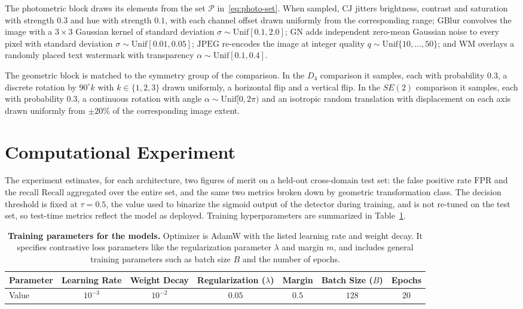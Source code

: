 \documentclass{article}
\begin{document}
The photometric block draws its elements from the set $\mathcal{P}$ in~\eqref{eq:photo-set}. When sampled, $\mathrm{CJ}$ jitters brightness, contrast and saturation with strength $0.3$ and hue with strength $0.1$, with each channel offset drawn uniformly from the corresponding range; $\mathrm{GBlur}$ convolves the image with a $3\times 3$ Gaussian kernel of standard deviation $\sigma\sim\mathrm{Unif}[0.1, 2.0]$; $\mathrm{GN}$ adds independent zero-mean Gaussian noise to every pixel with standard deviation $\sigma\sim\mathrm{Unif}[0.01, 0.05]$; $\mathrm{JPEG}$ re-encodes the image at integer quality $q\sim\mathrm{Unif}\{10, \ldots, 50\}$; and $\mathrm{WM}$ overlays a randomly placed text watermark with transparency $\alpha\sim\mathrm{Unif}[0.1, 0.4]$.

The geometric block is matched to the symmetry group of the comparison. In the $D_4$ comparison it samples, each with probability $0.3$, a discrete rotation by $90^\circ k$ with $k\in\{1, 2, 3\}$ drawn uniformly, a horizontal flip and a vertical flip. In the $SE(2)$ comparison it samples, each with probability $0.3$, a continuous rotation with angle $\alpha\sim\mathrm{Unif}[0, 2\pi)$ and an isotropic random translation with displacement on each axis drawn uniformly from $\pm 20\%$ of the corresponding image extent.

\section{Computational Experiment}\label{sec:exp}

The experiment estimates, for each architecture, two figures of merit on a held-out cross-domain test set: the false positive rate $\mathrm{FPR}$ and the recall $\mathrm{Recall}$ aggregated over the entire set, and the same two metrics broken down by geometric transformation class. The decision threshold is fixed at $\tau = 0.5$, the value used to binarize the sigmoid output of the detector during training, and is not re-tuned on the test set, so test-time metrics reflect the model as deployed. Training hyperparameters are summarized in Table~\ref{tab:hparams}.

\begin{table}[h]
\centering
\small
\caption{\textbf{Training parameters for the models.} Optimizer is AdamW with the listed learning rate and weight decay. It specifies contrastive loss parameters like the regularization parameter $\lambda$ and margin $m$, and includes general training parameters such as batch size $B$ and the number of epochs.}
\label{tab:hparams}
\begin{tabular}{@{}lcccccc@{}}
\toprule
Parameter & Learning Rate & Weight Decay & Regularization ($\lambda$) & Margin & Batch Size ($B$) & Epochs \\
\midrule
Value     & $10^{-3}$     & $10^{-2}$    & $0.05$                     & $0.5$  & $128$            & $20$ \\
\bottomrule
\end{tabular}
\end{table}
\end{document}
